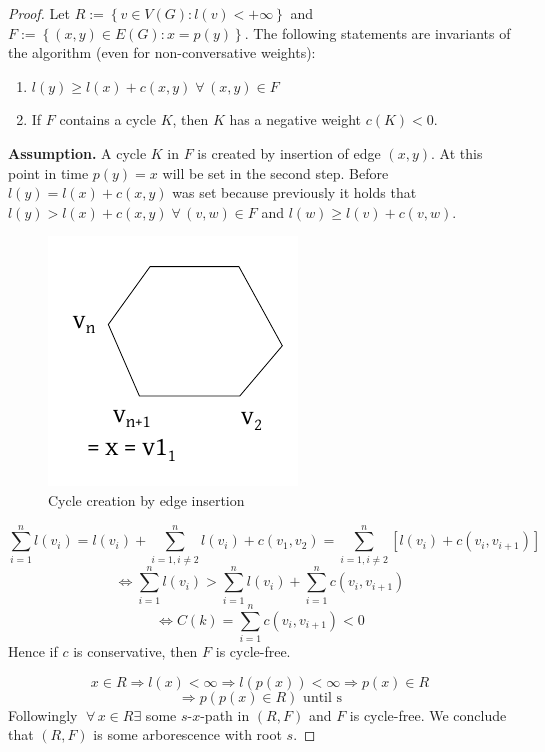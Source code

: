 \documentclass{article}
\newcommand{\set}[1]{\left\{#1\right\}}
\newcommand{\gath}[2]{$#1$-$#2$-path} %
\newcommand{\fall}{\;\forall\,}
\begin{document}
\begin{proof}
  Let $R := \set{v \in V(G): l(v) < +\infty}$ and $F := \set{(x, y) \in E(G): x = p(y)}$.
  The following statements are invariants of the algorithm (even for non-conversative weights):
  \begin{enumerate}
    \item $l(y) \geq l(x) + c(x, y) \fall (x, y) \in F$
    \item If $F$ contains a cycle $K$, then $K$ has a negative weight $c(K) < 0$.
  \end{enumerate}

  \textbf{Assumption.}
    A cycle $K$ in $F$ is created by insertion of edge $(x, y)$. At this point in time $p(y) = x$ will be set in the second step. Before $l(y) = l(x) + c(x, y)$ was set because previously it holds that $l(y) > l(x) + c(x, y) \fall (v, w) \in F$ and $l(w) \geq l(v) + c(v, w)$.
  \begin{figure}[!ht]
    \begin{center}
      \includegraphics{img/cycle.pdf}
      \caption{Cycle creation by edge insertion}
    \end{center}
  \end{figure}
  \[
    \sum_{i=1}^{n} l(v_i) = l(v_i) + \sum_{i=1, i\neq2}^n l(v_i) + c(v_1, v_2) = \sum_{i=1,i\neq2}^n [l(v_i) + c(v_i, v_{i+1})]
  \] \[
    \Leftrightarrow \sum_{i=1}^n l(v_i) > \sum_{i=1}^n l(v_i) + \sum_{i=1}^n c(v_i, v_{i+1})
  \] \[
    \Leftrightarrow C(k) = \sum_{i=1}^n c(v_i, v_{i+1}) < 0
  \]
  Hence if $c$ is conservative, then $F$ is cycle-free.

  \[
    x \in R \Rightarrow l(x) < \infty \Rightarrow l(p(x)) < \infty \Rightarrow p(x) \in R
  \] \[
    \Rightarrow p(p(x) \in R) \text{ until s}
  \]
  Followingly $\fall x \in R \exists$ some \gath sx in $(R, F)$ and $F$ is cycle-free. We conclude that $(R, F)$ is some arborescence  with root $s$.


\end{proof}
\end{document}
